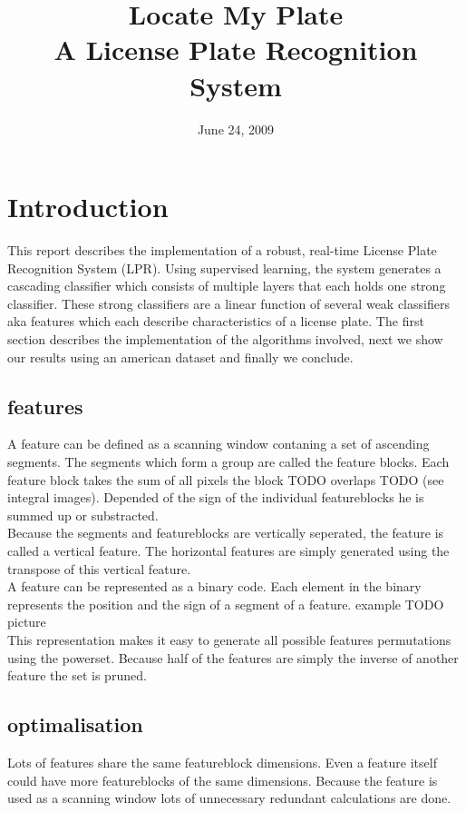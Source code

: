 \documentclass[a4paper,11pt]{article}
\title{Locate My Plate \\ A License Plate Recognition System}
\date{June 24, 2009}
\begin{document}
\maketitle
\section*{Introduction}
This report describes the implementation of a robust, real-time License Plate
Recognition System (LPR). Using supervised learning, the system generates a
cascading classifier which consists of multiple layers that each holds one
strong classifier. These strong classifiers are a linear function of several
weak classifiers aka features which each describe characteristics of a license
plate. The first section describes the implementation of the algorithms
involved, next we show our results using an american dataset and finally we
conclude.




	\subsection{features}
	A feature can be defined as a scanning window contaning a set of ascending
	segments. The segments which form a group are called the feature blocks. Each
	feature block takes the sum of all pixels the block TODO overlaps TODO (see
	integral images). Depended of the sign of the individual featureblocks he
	is summed up or substracted.\\ 

	Because the segments and featureblocks are vertically seperated, the
	feature is called a vertical feature.  The horizontal features are simply
	generated using the transpose of this vertical feature.\\

	A feature can be represented as a binary code. Each element in the binary
	represents the position and the sign of a segment of a feature.
	example TODO picture\\

	This representation makes it easy to generate all possible features
	permutations using the powerset.  Because half of the features are simply
	the inverse of another feature the set is pruned.

	\subsection{optimalisation}
	Lots of features share the same featureblock dimensions. Even a feature
	itself could have more featureblocks of the same dimensions.  Because the
	feature is used as a scanning window lots of unnecessary redundant
	calculations are done.
\end{document}
